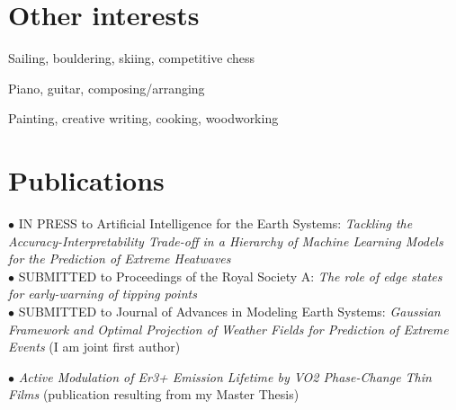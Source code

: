\documentclass[11pt, a4 paper]{article}
\newcommand{\bu}{$\bullet$ }
\begin{document}
\section*{Other interests}
  \begin{description}[style=multiline,leftmargin=3cm,align=right]
    \item[Sports] Sailing, bouldering, skiing, competitive chess
    \item[Music] Piano, guitar, composing/arranging
    \item[Other] Painting, creative writing, cooking, woodworking
  \end{description}

\section*{Publications}
  \begin{description}[style=multiline,leftmargin=3cm,align=right]
    \item[2024]
    \bu IN PRESS to Artificial Intelligence for the Earth Systems: \emph{Tackling the Accuracy-Interpretability Trade-off in a Hierarchy of Machine Learning Models for the Prediction of Extreme Heatwaves} \cite{lovoTacklingAccuracyInterpretabilityTradeHierarchy2024} \\
    \bu SUBMITTED to Proceedings of the Royal Society A: \emph{The role of edge states for early-warning of tipping points} \cite{lohmannRoleEdgeStates2024} \\
    \bu SUBMITTED to Journal of Advances in Modeling Earth Systems: \emph{Gaussian Framework and Optimal Projection of Weather Fields for Prediction of Extreme Events} \cite{mascoloGaussianFrameworkOptimal2024} (I am joint first author)
    \item[2023]
    \bu \emph{Active Modulation of Er3+ Emission Lifetime by VO2 Phase-Change Thin Films} \cite{kalinicActiveModulationEr32024} (publication resulting from my Master Thesis)
  \end{description}
\end{document}
